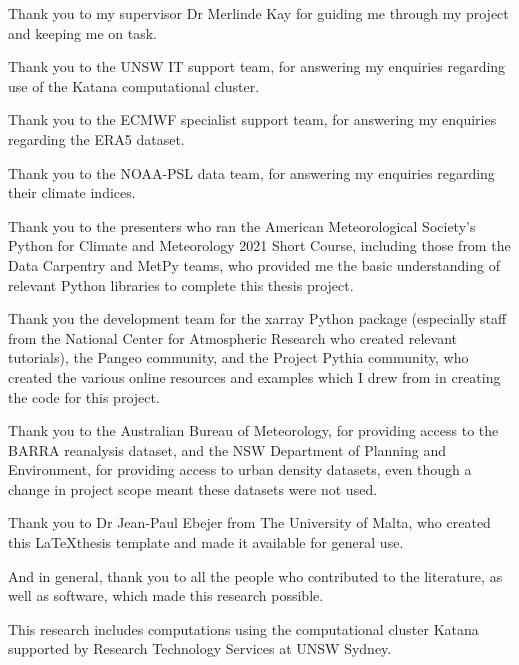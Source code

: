 \begin{acknowledgements}
Thank you to my supervisor Dr Merlinde Kay for guiding me through my project and keeping me on task. 

Thank you to the UNSW IT support team, for answering my enquiries regarding use of the Katana computational cluster.

Thank you to the ECMWF specialist support team, for answering my enquiries regarding the ERA5 dataset.

Thank you to the NOAA-PSL data team, for answering my enquiries regarding their climate indices.

Thank you to the presenters who ran the American Meteorological Society's Python for Climate and Meteorology 2021 Short Course, including those from the Data Carpentry and MetPy teams, who provided me the basic understanding of relevant Python libraries to complete this thesis project. 

Thank you the development team for the xarray Python package (especially staff from the National Center for Atmospheric Research who created relevant tutorials), the Pangeo community, and the Project Pythia community, who created the various online resources and examples which I drew from in creating the code for this project. 

Thank you to the Australian Bureau of Meteorology, for providing access to the BARRA reanalysis dataset, and the NSW Department of Planning and Environment, for providing access to urban density datasets, even though a change in project scope meant these datasets were not used.

Thank you to Dr Jean-Paul Ebejer from The University of Malta, who created this \LaTeX thesis template and made it available for general use.

And in general, thank you to all the people who contributed to the literature, as well as software, which made this research possible.

This research includes computations using the computational cluster Katana supported by Research Technology Services at UNSW Sydney.
\end{acknowledgements}